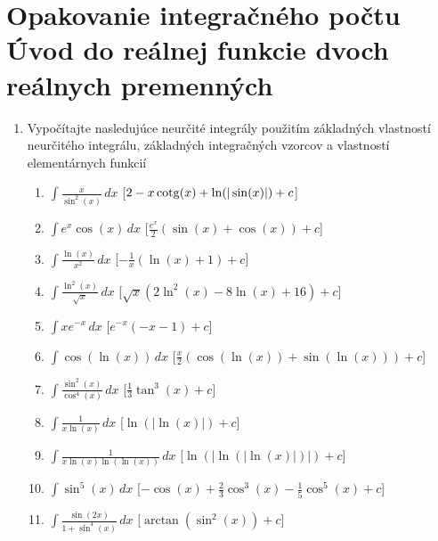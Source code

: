 

\section{Opakovanie integračného počtu \\ Úvod do reálnej funkcie dvoch reálnych premenných}


\begin{enumerate}

\item Vypočítajte nasledujúce neurčité integrály použitím základných vlastností neurčitého integrálu, základných integračných vzorcov a vlastností elementárnych funkcií
\begin{enumerate}
\item{$ \int \frac{x}{\sin^2(x)} \,dx$} \hspace{\fill} [$2-x\operatorname{cotg}(x)+\ln(|\sin(x)|)+c$]
\item{$ \int e^x\cos(x) \,dx$} \hspace{\fill} [$\frac{e^x}{2}(\sin(x)+\cos(x)) +c$]
\item{$ \int \frac{\ln(x)}{x^2} \,dx$} \hspace{\fill} [$-\frac{1}{x}(\ln(x)+1) +c$]
\item{$ \int \frac{\ln^2(x)}{\sqrt{x}} \,dx$} \hspace{\fill} [$\sqrt{x}(2\ln^2(x)-8\ln(x)+16) +c$]
\item{$ \int x e^{-x} \,dx$} \hspace{\fill} [$e^{-x}(-x-1) +c$]
\item{$ \int \cos(\ln(x)) \,dx$} \hspace{\fill} [$\frac{x}{2}(\cos(\ln(x))+\sin(\ln(x)))+c$]

\item{$ \int \frac{\sin^2(x)}{\cos^4(x)} \,dx$} \hspace{\fill} [$\frac{1}{3}\tan^3(x)+c$]

\item{$ \int \frac{1}{x\ln(x)} \,dx$} \hspace{\fill} [$\ln(|\ln(x)|)+c$]

\item{$ \int \frac{1}{x\ln(x)\ln(\ln(x))} \,dx$} \hspace{\fill} [$\ln(|\ln(|\ln(x)|)|)+c$]

\item{$ \int \sin^5(x) \,dx$} \hspace{\fill} [$-\cos(x)+\frac{2}{3}\cos^3(x)-\frac{1}{5}\cos^5(x)+c$]
\item{$ \int \frac{\sin(2x)}{1+\sin^4(x)} \,dx$} \hspace{\fill} [$\arctan(\sin^2(x))+c$]
\end{enumerate}



\end{enumerate}
